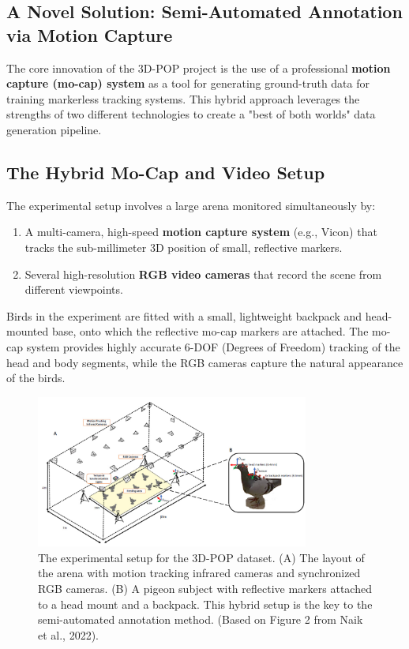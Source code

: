 \subsection{A Novel Solution: Semi-Automated Annotation via Motion Capture}

The core innovation of the 3D-POP project is the use of a professional \textbf{motion capture (mo-cap) system} as a tool for generating ground-truth data for training markerless tracking systems. This hybrid approach leverages the strengths of two different technologies to create a "best of both worlds" data generation pipeline.

\subsection{The Hybrid Mo-Cap and Video Setup}
The experimental setup involves a large arena monitored simultaneously by:
\begin{enumerate}
    \item A multi-camera, high-speed \textbf{motion capture system} (e.g., Vicon) that tracks the sub-millimeter 3D position of small, reflective markers.
    \item Several high-resolution \textbf{RGB video cameras} that record the scene from different viewpoints.
\end{enumerate}
Birds in the experiment are fitted with a small, lightweight backpack and head-mounted base, onto which the reflective mo-cap markers are attached. The mo-cap system provides highly accurate 6-DOF (Degrees of Freedom) tracking of the head and body segments, while the RGB cameras capture the natural appearance of the birds.

\begin{figure}[H]
    \centering
    \includegraphics[width=0.8\textwidth]{archivos/figuras/setup1.jpg} 
    \caption{The experimental setup for the 3D-POP dataset. (A) The layout of the arena with motion tracking infrared cameras and synchronized RGB cameras. (B) A pigeon subject with reflective markers attached to a head mount and a backpack. This hybrid setup is the key to the semi-automated annotation method. (Based on Figure 2 from Naik et al., 2022).}
    \label{fig:setup}
\end{figure}


